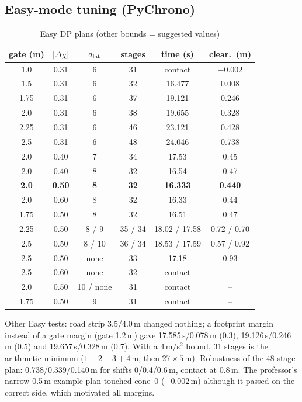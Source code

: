 \documentclass[conference]{IEEEtran}
\begin{document}
\subsection{Easy-mode tuning (PyChrono)}
\begin{table}[h]
\centering
\caption{Easy DP plans (other bounds = suggested values)}
\label{tab:easy}
\footnotesize
\setlength{\tabcolsep}{2.5pt}
\begin{tabular}{@{}cccccc@{}}
\toprule
gate (m) & $|\Delta\chi|$ & $a_{\rm lat}$ & stages & time (s) & clear.\ (m)\\
\midrule
1.0 & 0.31 & 6 & 31 & contact & $-0.002$\\
1.5 & 0.31 & 6 & 32 & 16.477 & 0.008\\
1.75 & 0.31 & 6 & 37 & 19.121 & 0.246\\
2.0 & 0.31 & 6 & 38 & 19.655 & 0.328\\
2.25 & 0.31 & 6 & 46 & 23.121 & 0.428\\
2.5 & 0.31 & 6 & 48 & 24.046 & 0.738\\
2.0 & 0.40 & 7 & 34 & 17.53 & 0.45\\
2.0 & 0.40 & 8 & 32 & 16.54 & 0.47\\
\textbf{2.0} & \textbf{0.50} & \textbf{8} & \textbf{32} & \textbf{16.333} & \textbf{0.440}\\
2.0 & 0.60 & 8 & 32 & 16.33 & 0.44\\
1.75 & 0.50 & 8 & 32 & 16.51 & 0.47\\
2.25 & 0.50 & 8 / 9 & 35 / 34 & 18.02 / 17.58 & 0.72 / 0.70\\
2.5 & 0.50 & 8 / 10 & 36 / 34 & 18.53 / 17.59 & 0.57 / 0.92\\
2.5 & 0.50 & none & 33 & 17.18 & 0.93\\
2.5 & 0.60 & none & 32 & contact & --\\
2.0 & 0.50 & 10 / none & 31 & contact & --\\
1.75 & 0.50 & 9 & 31 & contact & --\\
\bottomrule
\end{tabular}
\end{table}
Other Easy tests: road strip 3.5/4.0\,m changed nothing; a footprint margin
instead of a gate margin (gate 1.2\,m) gave 17.585\,s/0.078\,m (0.3),
19.126\,s/0.246\,m (0.5) and 19.657\,s/0.328\,m (0.7). With a 4\,m/s$^2$ bound,
31 stages is the arithmetic minimum ($1+2+3+4$\,m, then $27\times5$\,m).
Robustness of the 48-stage plan: 0.738/0.339/0.140\,m for shifts 0/0.4/0.6\,m,
contact at 0.8\,m. The professor's narrow 0.5\,m example plan touched cone~0
($-0.002$\,m) although it passed on the correct side, which motivated all
margins.
\end{document}

